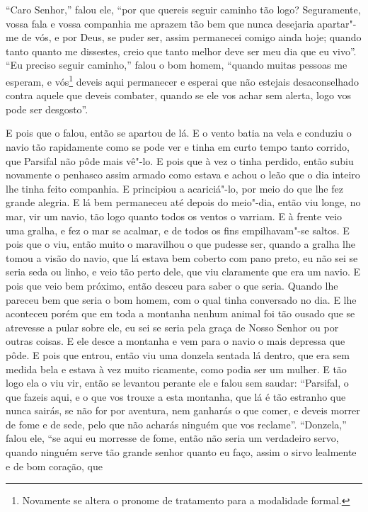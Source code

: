 “Caro Senhor,” falou ele, “por que quereis seguir caminho tão logo?
Seguramente, vossa fala e vossa companhia me aprazem tão bem que nunca
desejaria apartar"-me de vós, e por Deus, se puder ser, assim permanecei comigo
ainda hoje; quando tanto quanto me dissestes, creio que tanto melhor deve ser
meu dia que eu vivo”. “Eu preciso seguir caminho,” falou o bom homem, “quando
muitas pessoas me esperam, e vós\footnote{ Novamente se altera o pronome de
tratamento para a modalidade formal.}  deveis aqui permanecer e
esperai que não estejais desaconselhado contra aquele que deveis combater,
quando se ele vos achar sem alerta, logo vos pode ser desgosto”.

 E pois que o falou, então se apartou de lá. E o vento batia na vela e
conduziu o navio tão rapidamente como se pode ver e tinha em curto tempo tanto
corrido, que Parsifal não pôde mais vê"-lo. E pois que à vez o tinha perdido,
então subiu novamente o penhasco assim armado como estava e achou o leão que o
dia inteiro lhe tinha feito companhia. E principiou a acariciá"-lo, por meio do
que lhe fez grande alegria. E lá bem permaneceu até depois do meio"-dia, então
viu longe, no mar, vir um navio, tão logo quanto todos os ventos o varriam. E à
frente veio uma gralha, e fez o mar se acalmar, e de todos os fins
empilhavam"-se saltos. E pois que o viu, então muito o maravilhou o que pudesse
ser, quando a gralha lhe tomou a visão do navio, que lá estava bem coberto com
pano preto, eu não sei se seria seda ou linho,  e veio tão perto dele,
que viu claramente que era um navio. E pois que veio bem próximo, então desceu
para saber o que seria. Quando lhe pareceu bem que seria o bom homem, com o
qual tinha conversado no dia. E lhe aconteceu porém que em toda a montanha
nenhum animal foi tão ousado que se atrevesse a pular sobre ele, eu sei se
seria pela graça de Nosso Senhor ou por outras coisas. E ele desce a montanha e
vem para o navio o mais depressa que pôde. E pois que entrou, então viu uma
donzela sentada lá dentro, que era sem medida bela e estava à vez muito
ricamente, como podia ser um mulher. E tão logo ela o viu vir, então se
levantou perante ele e falou sem saudar: “Parsifal, o que fazeis aqui, e o que
vos trouxe a esta montanha, que lá é tão estranho que nunca sairás, se não for
por aventura, nem ganharás o que comer, e deveis morrer de fome e de sede, pelo
que não acharás ninguém que vos reclame”. “Donzela,” falou ele, “se aqui eu
morresse de fome, então não seria um verdadeiro servo, quando ninguém serve tão
grande senhor quanto eu faço,  assim o sirvo lealmente e de bom coração, que
